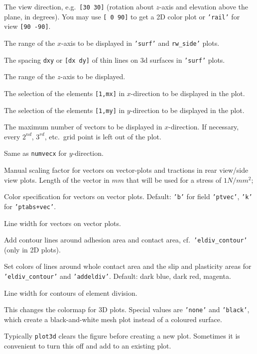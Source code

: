 \documentclass[12pt]{report}
\begin{document}
\begin{description}[leftmargin=6em,style=nextline]
\item[view] The view direction, e.g.\ {\tt [30 30]} (rotation about
        $z$-axis and elevation above the plane, in degrees). You may use
        {\tt [ 0 90]} to get a 2D color plot or {\tt 'rail'} for view
        {\tt [90 -90]}.
\item[xrange] The range of the $x$-axis to be displayed in {\tt 'surf'} and
        {\tt rw\_side'} plots.
\item[xysteps] The spacing {\tt dxy} or {\tt [dx dy]} of thin lines on 3d
        surfaces in {\tt 'surf'} plots. 
\item[zrange] The range of the $z$-axis to be displayed.
\item[ixrange] The selection of the elements {\tt [1,mx]} in $x$-direction
        to be displayed in the plot.
\item[iyrange] The selection of the elements {\tt [1,my]} in $y$-direction
        to be displayed in the plot.
\item[numvecx] The maximum number of vectors to be displayed in
        $x$-direction. If necessary, every $2^{nd}$, $3^{rd}$, etc.\ grid
        point is left out of the plot.
\item[numvecy] Same as {\tt numvecx} for $y$-direction.
\item[vecscale] Manual scaling factor for vectors on vector-plots and
        tractions in rear view/side view plots. Length of the vector in
        $mm$ that will be used for a stress of $1\unit{N/mm^2}$;
\item[veccolor] Color specification for vectors on vector plots. Default:
        {\tt 'b'} for field {\tt 'ptvec'}, {\tt 'k'} for {\tt 'ptabs+vec'}.
\item[vecwidth] Line width for vectors on vector plots.
\item[addeldiv] Add contour lines around adhesion area and contact area,
        cf.\ {\tt 'eldiv\_contour'} (only in 2D plots).
\item[eldivcol] Set colors of lines around whole contact area and the slip
        and plasticity areas for {\tt 'eldiv\_contour'} and {\tt 'addeldiv'}.
        Default: dark blue, dark red, magenta.
\item[eldivwid] Line width for contours of element division.
\item[colormap] This changes the colormap for 3D plots. Special values are
        {\tt 'none'} and {\tt 'black'}, which create a black-and-white mesh
        plot instead of a coloured surface.
\item[addplot] Typically {\tt plot3d} clears the figure before creating a
        new plot. Sometimes it is convenient to turn this off and add to an
        existing plot.
\end{description}
\end{document}
